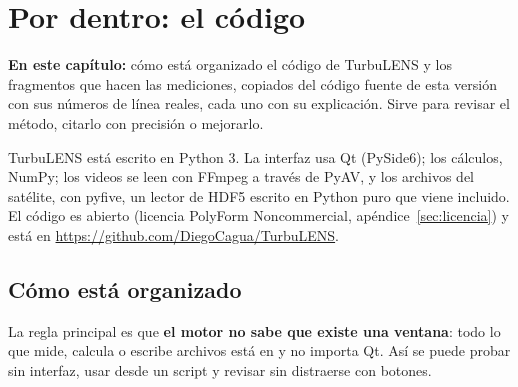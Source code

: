 \chapter{Por dentro: el código}\label{cap:codigo}

\begin{resumen}
\textbf{En este capítulo:} cómo está organizado el código de TurbuLENS y los fragmentos que hacen las mediciones,
copiados del código fuente de esta versión con sus números de línea reales, cada uno con su explicación. Sirve para
revisar el método, citarlo con precisión o mejorarlo.
\end{resumen}

TurbuLENS está escrito en Python 3. La interfaz usa Qt (PySide6); los cálculos, NumPy; los videos se leen con FFmpeg a
través de PyAV, y los archivos del satélite, con pyfive, un lector de HDF5 escrito en Python puro que viene incluido. El
código es abierto (licencia PolyForm Noncommercial, apéndice~\ref{sec:licencia}) y está en
\url{https://github.com/DiegoCagua/TurbuLENS}.

\section{Cómo está organizado}

La regla principal es que \textbf{el motor no sabe que existe una ventana}: todo lo que mide, calcula o escribe archivos
está en  y no importa Qt. Así se puede probar sin interfaz, usar desde un script y revisar sin
distraerse con botones.

